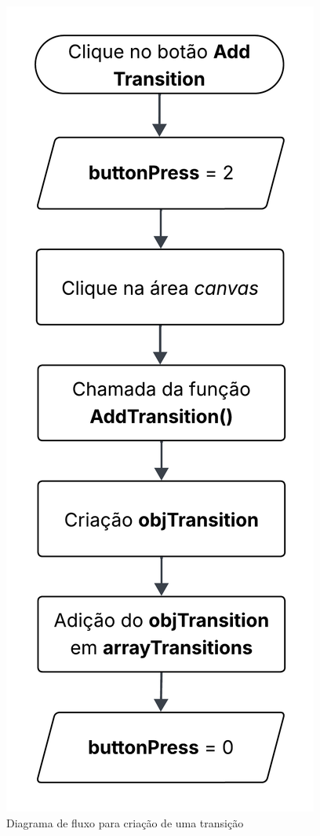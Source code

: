 \documentclass[
	12pt,				%
	openright,			%
	oneside,			%
	a4paper,			%
	english,			%
	brazil				%
	]{abntex2}
\begin{document}
\begin{figure}[ht] 
	\centering
	\includegraphics[scale=0.2]{figuras/diagrama-fluxo-addTransition.png}
	\caption[Diagrama de fluxo para criação de uma transição]{Diagrama de fluxo para criação de uma transição}
	\label{fig:addTransitionDiagram}
\end{figure}
\FloatBarrier
\end{document}
